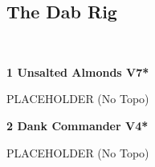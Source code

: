 \begin{multicols}{2}
			\subsection*{The Dab Rig}\label{bf:The Dab Rig}
			\begin{minipage}{\columnwidth}
			\
			\end{minipage}
			
					\begin{minipage}{\linewidth}	
					\label{rt:Unsalted Almonds}
\colorbox{Goldenrod!50}{
\parbox{0.95\textwidth}{
\textbf{
1 Unsalted Almonds V7*  
}
}
}

					\begin{adjustwidth}{0.5cm}{}				
					PLACEHOLDER
						\newline (No Topo) 
					\end{adjustwidth}
					\end{minipage}
					\begin{minipage}{\linewidth}	
					\label{rt:Dank Commander}
\colorbox{RoyalBlue!20}{
\parbox{0.95\textwidth}{
\textbf{
2 Dank Commander V4*  
}
}
}

					\begin{adjustwidth}{0.5cm}{}				
					PLACEHOLDER
						\newline (No Topo) 
					\end{adjustwidth}
					\end{minipage}
\end{multicols}
\clearpage
